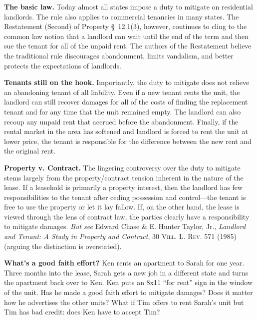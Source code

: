 
\item \textbf{The basic law.}  Today almost all states impose a duty to mitigate
on residential landlords.  The rule also applies to commercial tenancies in
many states.  The Restatement (Second) of Property \S~12.1(3), however,
continues to cling to the common law notion that a landlord can wait until the
end of the term and then sue the tenant for all of the unpaid rent.  The
authors of the Restatement believe the traditional rule discourages
abandonment, limits vandalism, and better protects the expectations of
landlords.  


\item \textbf{Tenants still on the hook.}  Importantly, the duty to mitigate
does not relieve an abandoning tenant of all liability.  Even if a new tenant
rents the unit, the landlord can still recover damages for all of the costs of
finding the replacement tenant and for any time that the unit remained empty.
The landlord can also recoup any unpaid rent that accrued before the
abandonment.  Finally, if the rental market in the area has softened and
landlord is forced to rent the unit at lower price, the tenant is responsible
for the difference between the new rent and the original rent.


\item \textbf{Property v. Contract.} The lingering controversy over the duty to
mitigate stems largely from the property/contract tension inherent in the
nature of the lease.  If a leasehold is primarily a property interest, then the
landlord has few responsibilities to the tenant after ceding possession and
control---the tenant is free to use the property or let it lay fallow.  If, on
the other hand, the lease is viewed through the lens of contract law, the
parties clearly have a responsibility to mitigate damages.  \textit{But see}
Edward Chase \& E. Hunter Taylor, Jr., \textit{Landlord and Tenant: A Study in
Property and Contract}, \textsc{30 Vill. L. Rev.} 571 (1985) (arguing the
distinction is overstated).


\item \textbf{What's a good faith effort?} Ken rents an apartment to Sarah for
one year.  Three months into the lease, Sarah gets a new job in a different
state and turns the apartment back over to Ken.  Ken puts an 8x11 ``for rent''
sign in the window of the unit.  Has he made a good faith effort to mitigate
damages? Does it matter how he advertises the other units? What if Tim offers
to rent Sarah's unit but Tim has bad credit: does Ken have to accept Tim?


